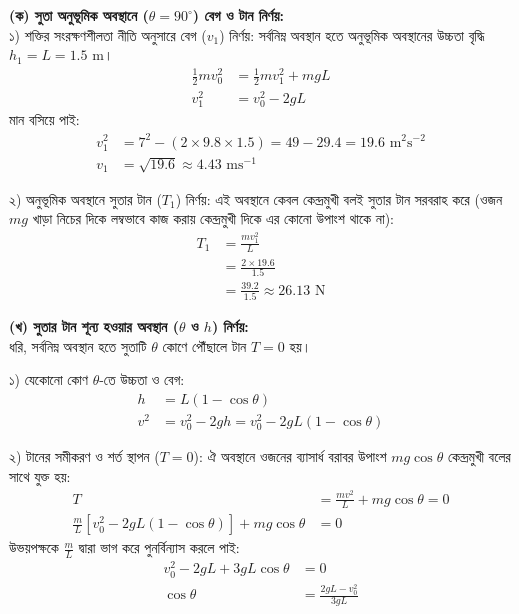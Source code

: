 \documentclass[12pt, a4paper]{article}
\begin{document}
\begin{tcolorbox}[solutionbox={সমাধান (Solution)}]
\noindent
\textbf{(ক) সুতা অনুভূমিক অবস্থানে ($\theta = 90^\circ$) বেগ ও টান নির্ণয়:} \\
১) শক্তির সংরক্ষণশীলতা নীতি অনুসারে বেগ ($v_1$) নির্ণয়: সর্বনিম্ন অবস্থান হতে অনুভূমিক অবস্থানের উচ্চতা বৃদ্ধি $h_1 = L = 1.5\text{ m}$।
\begin{align*}
    \frac{1}{2} m v_0^2 &= \frac{1}{2} m v_1^2 + m g L \\
    v_1^2 &= v_0^2 - 2 g L
\end{align*}
মান বসিয়ে পাই:
\begin{align*}
    v_1^2 &= 7^2 - (2 \times 9.8 \times 1.5) = 49 - 29.4 = 19.6\text{ m}^2\text{s}^{-2} \\
    v_1 &= \sqrt{19.6} \approx \mathbf{4.43}\text{ ms}^{-1}
\end{align*}

২) অনুভূমিক অবস্থানে সুতার টান ($T_1$) নির্ণয়: এই অবস্থানে কেবল কেন্দ্রমুখী বলই সুতার টান সরবরাহ করে (ওজন $mg$ খাড়া নিচের দিকে লম্বভাবে কাজ করায় কেন্দ্রমুখী দিকে এর কোনো উপাংশ থাকে না):
\begin{align*}
    T_1 &= \frac{m v_1^2}{L} \\
        &= \frac{2 \times 19.6}{1.5} \\
        &= \frac{39.2}{1.5} \approx \mathbf{26.13}\text{ N}
\end{align*}

\vspace{0.5em}
\noindent\textbf{(খ) সুতার টান শূন্য হওয়ার অবস্থান ($\theta$ ও $h$) নির্ণয়:} \\
ধরি, সর্বনিম্ন অবস্থান হতে সুতাটি $\theta$ কোণে পৌঁছালে টান $T = 0$ হয়।

১) যেকোনো কোণ $\theta$-তে উচ্চতা ও বেগ:
\begin{align*}
    h &= L(1 - \cos\theta) \\
    v^2 &= v_0^2 - 2 g h = v_0^2 - 2 g L (1 - \cos\theta)
\end{align*}

২) টানের সমীকরণ ও শর্ত স্থাপন ($T = 0$): ঐ অবস্থানে ওজনের ব্যাসার্ধ বরাবর উপাংশ $mg \cos\theta$ কেন্দ্রমুখী বলের সাথে যুক্ত হয়:
\begin{align*}
    T &= \frac{m v^2}{L} + m g \cos\theta = 0 \\
    \frac{m}{L} \left[v_0^2 - 2 g L (1 - \cos\theta)\right] + m g \cos\theta &= 0
\end{align*}
উভয়পক্ষকে $\frac{m}{L}$ দ্বারা ভাগ করে পুনর্বিন্যাস করলে পাই:
\begin{align*}
    v_0^2 - 2 g L + 3 g L \cos\theta &= 0 \\
    \cos\theta &= \frac{2 g L - v_0^2}{3 g L}
\end{align*}


\end{tcolorbox}
\end{document}
